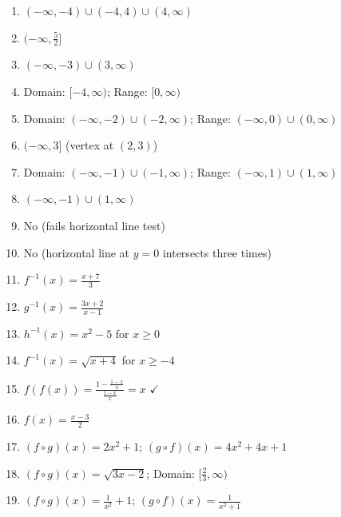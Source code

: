 \documentclass[12pt,a4paper]{article}
\begin{document}
\begin{enumerate}
    \item $(-\infty, -4) \cup (-4, 4) \cup (4, \infty)$
    
    \item $(-\infty, \frac{5}{2}]$
    
    \item $(-\infty, -3) \cup (3, \infty)$
    
    \item Domain: $[-4, \infty)$; Range: $[0, \infty)$
    
    \item Domain: $(-\infty, -2) \cup (-2, \infty)$; Range: $(-\infty, 0) \cup (0, \infty)$
    
    \item $(-\infty, 3]$ (vertex at $(2, 3)$)
    
    \item Domain: $(-\infty, -1) \cup (-1, \infty)$; Range: $(-\infty, 1) \cup (1, \infty)$
    
    \item $(-\infty, -1) \cup (1, \infty)$
    
    \item No (fails horizontal line test)
    
    \item No (horizontal line at $y = 0$ intersects three times)
    
    \item $f^{-1}(x) = \frac{x+7}{3}$
    
    \item $g^{-1}(x) = \frac{3x+2}{x-1}$
    
    \item $h^{-1}(x) = x^2 - 5$ for $x \geq 0$
    
    \item $f^{-1}(x) = \sqrt{x+4}$ for $x \geq -4$
    
    \item $f(f(x)) = \frac{1-\frac{1-x}{x}}{\frac{1-x}{x}} = x$ $\checkmark$
    
    \item $f(x) = \frac{x-3}{2}$
    
    \item $(f \circ g)(x) = 2x^2 + 1$; $(g \circ f)(x) = 4x^2 + 4x + 1$
    
    \item $(f \circ g)(x) = \sqrt{3x-2}$; Domain: $[\frac{2}{3}, \infty)$
    
    \item $(f \circ g)(x) = \frac{1}{x^2} + 1$; $(g \circ f)(x) = \frac{1}{x^2+1}$
    

\end{enumerate}
\end{document}
